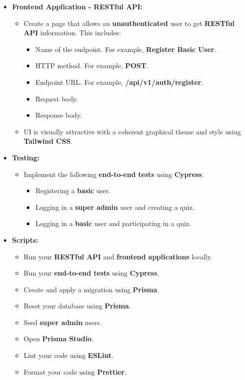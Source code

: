 \documentclass{article}
\begin{document}
\begin{itemize}
	\item \textbf{Frontend Application - RESTful API:}
	\begin{itemize}
		\item Create a page that allows an \textbf{unauthenticated} user to get \textbf{RESTful API} information. This includes:
		\begin{itemize}
			\item Name of the endpoint. For example, \textbf{Register Basic User}.
			\item HTTP method. For example, \textbf{POST}.
			\item Endpoint URL. For example, \textbf{/api/v1/auth/register}.
			\item Request body.
			\item Response body.
		\end{itemize}
		\item UI is visually attractive with a coherent graphical theme and style using \textbf{Tailwind CSS}.
	\end{itemize}

	\item \textbf{Testing:}
	\begin{itemize}
		\item Implement the following \textbf{end-to-end tests} using \textbf{Cypress}:
		\begin{itemize}
			\item Registering a \textbf{basic} user.
			\item Logging in a \textbf{super admin} user and creating a quiz.
			\item Logging in a \textbf{basic} user and participating in a quiz.
		\end{itemize}
	\end{itemize}

	\item \textbf{Scripts:}
	\begin{itemize}
		\item Run your \textbf{RESTful API} and \textbf{frontend applications} locally.
		\item Run your \textbf{end-to-end tests} using \textbf{Cypress}.
		\item Create and apply a migration using \textbf{Prisma}.
		\item Reset your database using \textbf{Prisma}.
		\item Seed \textbf{super admin} users.
		\item Open \textbf{Prisma Studio}. 
		\item Lint your code using \textbf{ESLint}.
		\item Format your code using \textbf{Prettier}.
	\end{itemize}
\end{itemize}
\end{document}
